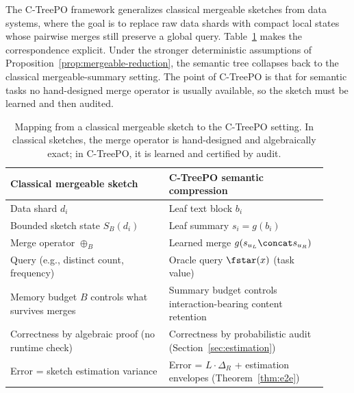 The C-TreePO framework generalizes classical mergeable sketches from data systems, where the goal is to replace raw data shards with compact local states whose pairwise merges still preserve a global query. Table~\ref{tab:sketch-mapping} makes the correspondence explicit. Under the stronger deterministic assumptions of Proposition~\ref{prop:mergeable-reduction}, the semantic tree collapses back to the classical mergeable-summary setting. The point of C-TreePO is that for semantic tasks no hand-designed merge operator is usually available, so the sketch must be learned and then audited.

\begin{table}[t]
    \centering
    \small
    \begin{tabular}{p{0.46\linewidth}p{0.46\linewidth}}
        \toprule
        Classical mergeable sketch & C-TreePO semantic compression \\
        \midrule
        Data shard $d_i$ & Leaf text block $b_i$ \\
        Bounded sketch state $S_B(d_i)$ & Leaf summary $s_i = g(b_i)$ \\
        Merge operator $\oplus_B$ & Learned merge $g(s_{u_L}\concat s_{u_R})$ \\
        Query (e.g., distinct count, frequency) & Oracle query $\fstar(x)$ (task value) \\
        Memory budget $B$ controls what survives merges & Summary budget controls interaction-bearing content retention \\
        Correctness by algebraic proof (no runtime check) & Correctness by probabilistic audit (Section~\ref{sec:estimation}) \\
        Error = sketch estimation variance & Error = $L \cdot \Delta_R$ + estimation envelopes (Theorem~\ref{thm:e2e}) \\
        \bottomrule
    \end{tabular}
    \caption{Mapping from a classical mergeable sketch to the C-TreePO setting. In classical sketches, the merge operator is hand-designed and algebraically exact; in C-TreePO, it is learned and certified by audit.}
    \label{tab:sketch-mapping}
\end{table}

